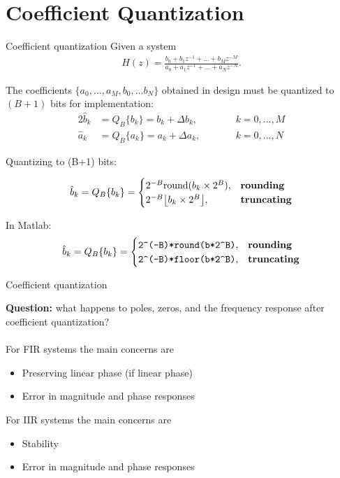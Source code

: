 \documentclass[10pt, handout]{beamer}
\begin{document}
%
\section{Coefficient Quantization}
\begin{frame}{Coefficient quantization}
	Given a system
	\begin{align*}
		H(z) = \frac{b_0 + b_1z^{-1} + \ldots + b_Mz^{-M}}{a_0 + a_1z^{-1} + \ldots + a_Nz^{-N}}.
	\end{align*}
	
	The coefficients $\{a_0, \ldots, a_M, b_0,\ldots b_N\}$ obtained in design must  be quantized to $(B+1)$ bits for implementation:
	\begin{alignat*}{2}
		\hat{b}_k &= Q_B\{b_k\} = b_k + \Delta b_k, \qquad &&  k = 0, \ldots, M \\
		\hat{a}_k &= Q_B\{a_k\} = a_k + \Delta a_k, \qquad && k = 0, \ldots, N
	\end{alignat*}
	
	\pause
	\vspace{0.25cm}
	Quantizing to (B+1) bits:
	
	\begin{equation*}
	\hat{b}_k = Q_B\{b_k\} = \begin{cases}
	2^{-B}\mathrm{round}(b_k\times 2^B), & \text{\textbf{rounding}} \\
	2^{-B}\big\lfloor b_k\times 2^B\big\rfloor, & \text{\textbf{truncating}}
	\end{cases}
	\end{equation*}
	
	In Matlab:
	\begin{equation*}
	\hat{b}_k = Q_B\{b_k\} = \begin{cases}
	\texttt{2\textasciicircum(-B)*round(b*2\textasciicircum B)}, & \text{\textbf{rounding}} \\
	\texttt{2\textasciicircum(-B)*floor(b*2\textasciicircum B)}, & \text{\textbf{truncating}}
	\end{cases}
	\end{equation*}
\end{frame}

\begin{frame}{Coefficient quantization}

\textbf{Question:} what happens to poles, zeros, and the frequency response after coefficient quantization?
~\\
~\\

For FIR systems the main concerns are
\begin{itemize}
	\item Preserving linear phase (if linear phase)
	\item Error in magnitude and phase responses
\end{itemize}

For IIR systems the main concerns are
\begin{itemize}
	\item Stability
	\item Error in magnitude and phase responses
\end{itemize}

\end{frame}
\end{document}
